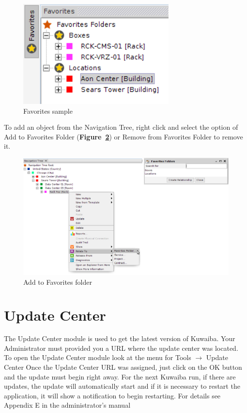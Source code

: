 \documentclass[a4paper]{article}
\begin{document}
			\begin{figure}[h!]
				\centering
				\includegraphics[width=0.4\linewidth]{img/favorites_explorer.png}
				\caption{Favorites sample}
				\label{fig:bookmakrs}
			\end{figure}
			
			To add an object from the Navigation Tree, right click and select the option of Add to Favorites Folder (\textbf{Figure~\ref{fig:favorites_add_to}}) or Remove from Favorites Folder to remove it.
						
			\begin{figure}[h!]
				\centering
				\includegraphics[width=0.9\linewidth]{img/favorites_add_to.png}
				\caption{Add to Favorites folder}
				\label{fig:favorites_add_to}
			\end{figure}
							
		\clearpage
		\section{Update Center}\label{sec:update_center}
		The Update Center module is used to get the latest version of Kuwaiba. Your Administrator must provided you a URL where the update center was located. To open the Update Center module look at the menu for Tools $\rightarrow$ Update Center
		\newline
		Once the Update Center URL was assigned, just click on the OK button and the update must begin right away. For the next Kuwaiba run, if there are updates, the update will automatically start and if it is necessary to restart the application, it will show a notification to begin restarting.
		\newline
		For details see Appendix E in the administrator's manual
		
\end{document}
